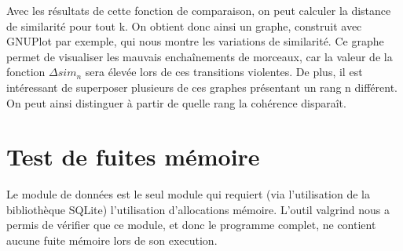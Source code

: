 Avec les résultats de cette fonction de comparaison, on peut calculer la
distance de similarité pour tout k. On obtient donc ainsi un graphe, construit
avec GNUPlot par exemple, qui nous montre les variations de similarité. Ce
graphe permet de visualiser les mauvais enchaînements de morceaux, car la valeur
de la fonction $\Delta{}sim_{n}$ sera élevée lors de ces transitions violentes.
De plus, il est intéressant de superposer plusieurs de ces graphes présentant un
rang n différent. On peut ainsi distinguer à partir de quelle rang la cohérence
disparaît.

\section{Test de fuites mémoire}
\label{tests:valgrind}

Le module de données est le seul module qui requiert (via l'utilisation de la 
bibliothèque SQLite) l'utilisation d'allocations mémoire. L'outil valgrind nous 
a permis de vérifier que ce module, et donc le programme complet, ne contient 
aucune fuite mémoire lors de son execution.

